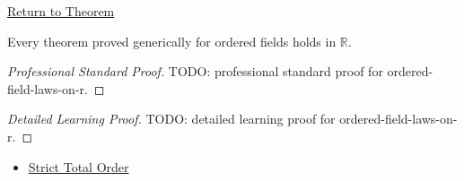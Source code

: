 \newpage
{}
\label{prf:ordered-field-laws-on-r}

\begin{remark*}[Return]
\hyperref[cor:ordered-field-laws-on-r]{Return to Theorem}
\end{remark*}

\begin{corollary*}
Every theorem proved generically for ordered fields holds in $\mathbb{R}$.
\end{corollary*}

\begin{proof}[Professional Standard Proof]
\LRAProofBodyStart
TODO: professional standard proof for ordered-field-laws-on-r.
\end{proof}

\begin{proof}[Detailed Learning Proof]
\LRAProofBodyStart
TODO: detailed learning proof for ordered-field-laws-on-r.
\end{proof}

\begin{remark*}
\end{remark*}

\begin{dependencies}
\begin{itemize}
  \item \hyperref[def:strict-total-order]{Strict Total Order}
\end{itemize}
\end{dependencies}

\clearpage
